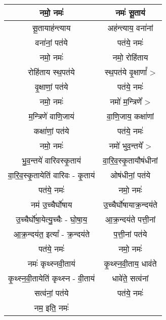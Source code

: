 {\begin{longtable}{|c|c|}
नमो॒ नमः॑                  & नमः॑ सू॒ताय॑\\
\hline
सू॒तायाह॑न्त्याय              & अह॑न्त्याय॒ वना॑नां\\
\hline
वना॑नां॒ पत॑ये                & पत॑ये॒ नमः॑\\
\hline
नमो॒ नमः॑                  & नमो॒ रोहि॑ताय\\
\hline
रोहि॑ताय स्थ॒पत॑ये            & स्थ॒पत॑ये वृ॒क्षाणां᳚ >\\
\hline
वृ॒क्षाणां॒ पत॑ये               & पत॑ये॒ नमः॑\\
\hline
नमो॒ नमः॑                  & नमो॑ म॒न्त्रिणे᳚ >\\
\hline
म॒न्त्रिणे॑ वाणि॒जाय॑           & वा॒णि॒जाय॒ कक्षा॑णां\\
\hline
कक्षा॑णां॒ पत॑ये               & पत॑ये॒ नमः॑\\
\hline
नमो॒ नमः॑                  & नमो॑ भुव॒न्तये᳚ >\\
\hline
भु॒व॒न्तये॑ वारिवस्कृ॒ताय॑         & वा॒रि॒व॒स्कृ॒तायौष॑धीनां\\
\hline
वा॒रि॒व॒स्कृ॒तायेति॑ वारिवः - कृ॒ताय॑ & ओष॑धीनां॒ पत॑ये\\
\hline
पत॑ये॒ नमः॑                  & नमो॒ नमः॑\\
\hline
नम॑ उ॒च्चैर्घो॑षाय             & उ॒च्चैर्घो॑षायाक्र॒न्दय॑ते\\
\hline
उ॒च्चैर्घो॑षा॒येत्यु॒च्चैः - घो॒षा॒य॒   & आ॒क्र॒न्दय॑ते पत्ती॒नां\\
\hline
आ॒क्र॒न्दय॑त॒ इत्या᳚ - क्र॒न्दय॑ते    & प॒त्ती॒नां पत॑ये\\
\hline
पत॑ये॒ नमः॑                  & नमो॒ नमः॑\\
\hline
नमः॑ कृथ्स्नवी॒ताय॑            & कृ॒थ्स्न॒वी॒ताय॒ धाव॑ते\\
\hline
कृ॒थ्स्न॒वी॒तायेति॑ कृथ्स्न - वी॒ताय॑ & धावे॑ते॒ सत्व॑नां\\
\hline
सत्व॑नां॒ पत॑ये                & पत॑ये॒ नमः॑\\
\hline
नम॒ इति॒ नमः॑               & \\
\hline
\end{longtable}
}
